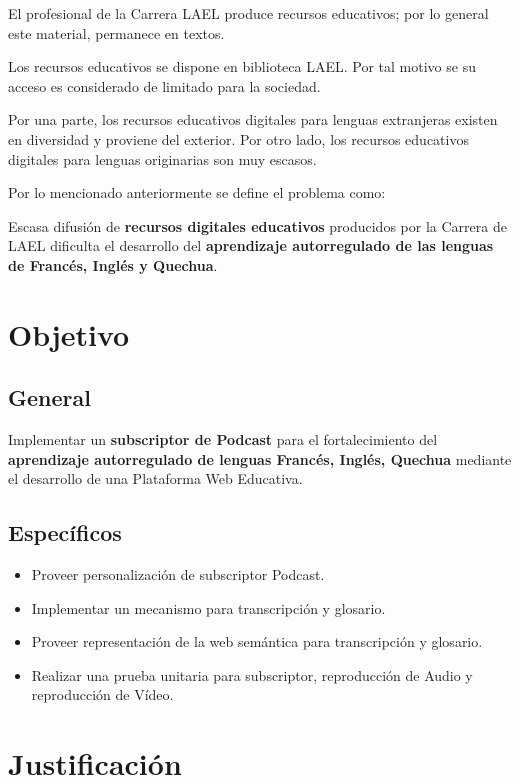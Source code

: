 El profesional de la Carrera LAEL produce recursos educativos; por lo general
este material, permanece en textos.

Los recursos educativos se dispone en biblioteca LAEL. Por tal motivo se su
acceso es considerado de limitado para la sociedad.

Por una parte, los recursos educativos digitales para lenguas extranjeras
existen en diversidad y proviene del exterior. Por otro lado, los recursos
educativos digitales para lenguas originarias son muy escasos. 
 																						
Por lo mencionado anteriormente se define el problema como:

Escasa difusión de \textbf{recursos digitales educativos} producidos por 
la Carrera de LAEL dificulta el desarrollo del \textbf{aprendizaje 
autorregulado de las lenguas de Francés, Inglés y Quechua}.

\section{Objetivo}

\subsection{General}

Implementar un \textbf{subscriptor de Podcast} para el fortalecimiento del 
\textbf{aprendizaje autorregulado de lenguas Francés, Inglés, Quechua} mediante
el desarrollo de una Plataforma Web Educativa.

\subsection{Específicos}

\begin{itemize}

\item Proveer personalización de subscriptor Podcast.
\item Implementar un mecanismo para transcripción y glosario.
\item Proveer representación de la web semántica para transcripción y glosario.
\item Realizar una prueba unitaria para subscriptor, reproducción de Audio y
reproducción de Vídeo.

\end{itemize}

\section{Justificación}

